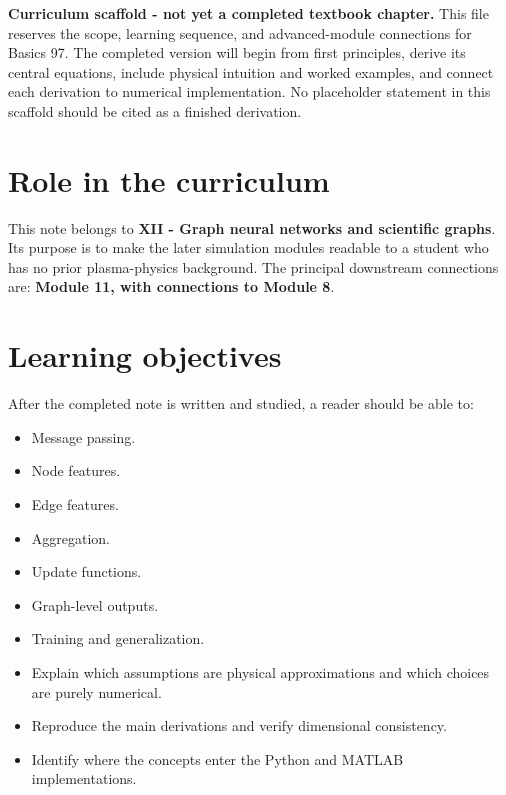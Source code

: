 \documentclass[11pt]{article}
\begin{document}

\begin{overviewbox}
\textbf{Curriculum scaffold - not yet a completed textbook chapter.} This file reserves the scope, learning sequence, and advanced-module connections for Basics 97. The completed version will begin from first principles, derive its central equations, include physical intuition and worked examples, and connect each derivation to numerical implementation. No placeholder statement in this scaffold should be cited as a finished derivation.
\end{overviewbox}

\ProjectTOC

\section{Role in the curriculum}
This note belongs to \textbf{XII - Graph neural networks and scientific graphs}. Its purpose is to make the later simulation modules readable to a student who has no prior plasma-physics background. The principal downstream connections are: \textbf{Module 11, with connections to Module 8}.

\section{Learning objectives}
After the completed note is written and studied, a reader should be able to:
\begin{itemize}[leftmargin=1.6em]
\item Message passing.
\item Node features.
\item Edge features.
\item Aggregation.
\item Update functions.
\item Graph-level outputs.
\item Training and generalization.
\item Explain which assumptions are physical approximations and which choices are purely numerical.
\item Reproduce the main derivations and verify dimensional consistency.
\item Identify where the concepts enter the Python and MATLAB implementations.
\end{itemize}
\end{document}
